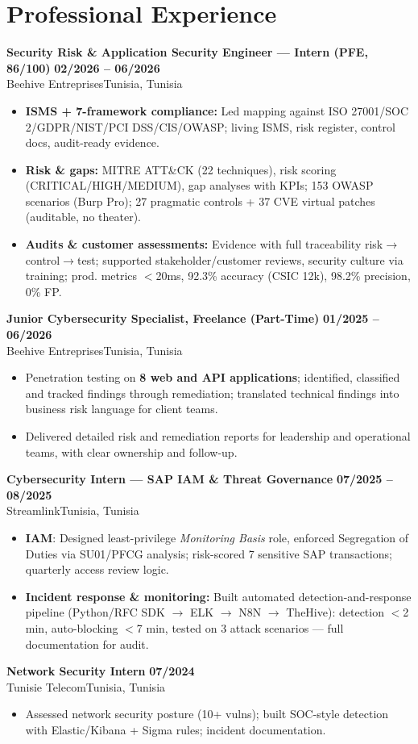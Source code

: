 \documentclass[a4paper,9pt]{article}
\newcommand{\cventry}[4]{\textbf{#1} \hfill \textbf{#4}\\[0.3pt]#2{\ifx\relax#3\relax\else, #3\fi}\par\vspace{0.6pt}}
\begin{document}
\section{Professional Experience}
\cventry{Security Risk \& Application Security Engineer --- Intern (PFE, 86/100)}{Beehive Entreprises}{Tunisia}{02/2026 -- 06/2026}
\begin{itemize}
  \item \textbf{ISMS + 7-framework compliance:} Led mapping against ISO 27001/SOC 2/GDPR/NIST/PCI DSS/CIS/OWASP; living ISMS, risk register, control docs, audit-ready evidence.
  \item \textbf{Risk \& gaps:} MITRE ATT\&CK (22 techniques), risk scoring (CRITICAL/HIGH/MEDIUM), gap analyses with KPIs; 153 OWASP scenarios (Burp Pro); 27 pragmatic controls + 37 CVE virtual patches (auditable, no theater).
  \item \textbf{Audits \& customer assessments:} Evidence with full traceability risk$\to$control$\to$test; supported stakeholder/customer reviews, security culture via training; prod. metrics $<$20ms, 92.3\% accuracy (CSIC 12k), 98.2\% precision, 0\% FP.
\end{itemize}
\cventry{Junior Cybersecurity Specialist, Freelance (Part-Time)}{Beehive Entreprises}{Tunisia}{01/2025 -- 06/2026}
\begin{itemize}
  \item Penetration testing on \textbf{8 web and API applications}; identified, classified and tracked findings through remediation; translated technical findings into business risk language for client teams.
  \item Delivered detailed risk and remediation reports for leadership and operational teams, with clear ownership and follow-up.
\end{itemize}
\cventry{Cybersecurity Intern --- SAP IAM \& Threat Governance}{Streamlink}{Tunisia}{07/2025 -- 08/2025}
\begin{itemize}
  \item \textbf{IAM}: Designed least-privilege \textit{Monitoring Basis} role, enforced Segregation of Duties via SU01/PFCG analysis; risk-scored 7 sensitive SAP transactions; quarterly access review logic.
  \item \textbf{Incident response \& monitoring:} Built automated detection-and-response pipeline (Python/RFC SDK $\to$ ELK $\to$ N8N $\to$ TheHive): detection $<$2 min, auto-blocking $<$7 min, tested on 3 attack scenarios — full documentation for audit.
\end{itemize}
\cventry{Network Security Intern}{Tunisie Telecom}{Tunisia}{07/2024}
\begin{itemize}
  \item Assessed network security posture (10+ vulns); built SOC-style detection with Elastic/Kibana + Sigma rules; incident documentation.
\end{itemize}
\end{document}

